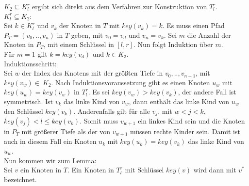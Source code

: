 \documentclass[a4paper,12pt]{article}
\begin{document}
\noindent $K_2 \subseteq  K^r_l$ ergibt sich direkt aus dem Verfahren zur Konstruktion von $T^r_l$.\\

\noindent $ K^r_l \subseteq K_2$:\\
Sei $k \in K^r_l$ und $v_k$ der Knoten in $T$ mit $\mathit{key}(v_k) = k$. Es muss einen Pfad $P_T = \left(v_0,..,v_n\right)$ in $T$ geben, mit $v_0 = v_d$ und $v_n = v_k$. Sei $m$ die Anzahl der Knoten in $P_T$, mit einem Schlüssel in  $\left[l,r\right]$. Nun folgt Induktion über $m$.\\
Für $m = 1$ gilt $k = \mathit{key}\left(v_d\right)$  und $k \in K_2$. \\
Induktionsschritt:\\
Sei $w$ der Index des Knotens mit der größten Tiefe in $ v_0,..,v_{n-1}$, mit $\mathit{key}(v_w) \in~K_2$. Nach Induktionsvoraussetzung gibt es einen Knoten $u_w$ mit $\mathit{key}(u_w) = \mathit{key}(v_w)$ in $T^r_l$.  Es sei $\mathit{key}(v_w) > \mathit{key}(v_k)$, der andere Fall ist symmetrisch. Ist $v_k$ das linke Kind von $v_w$, dann enthält das linke Kind von $u_w$ den Schlüssel $\mathit{key}(v_k)$. Anderenfalls gilt für alle $v_j$, mit $w < j < k$, $\mathit{key}(v_j) < l \leq \mathit{key}(v_k)$. Somit muss $v_{w+1}$ ein linkes Kind sein und die Knoten in $P_T$ mit größerer Tiefe als der von $v_{w+1}$ müssen rechte Kinder sein. Damit ist auch in diesem Fall ein Knoten $u_k$ mit $\mathit{key}(u_k) = \mathit{key}(v_k)$ das linke Kind von $u_w$.  \\

\noindent Nun kommen wir zum Lemma:\\






\noindent Sei $v$ ein Knoten in $T$. Ein Knoten in $T^r_l$ mit Schlüssel $\mathit{key}(v)$ wird dann mit $v^*$ bezeichnet.  
\end{document}
